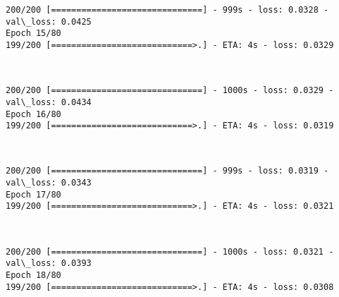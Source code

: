 \documentclass[11pt]{article}
\begin{document}
    \begin{Verbatim}[commandchars=\\\{\}]
200/200 [==============================] - 999s - loss: 0.0328 - val\_loss: 0.0425
Epoch 15/80
199/200 [============================>.] - ETA: 4s - loss: 0.0329
    \end{Verbatim}

    \begin{center}
    \end{center}
    { \hspace*{\fill} \\}
    
    \begin{Verbatim}[commandchars=\\\{\}]
200/200 [==============================] - 1000s - loss: 0.0329 - val\_loss: 0.0434
Epoch 16/80
199/200 [============================>.] - ETA: 4s - loss: 0.0319
    \end{Verbatim}

    \begin{center}
    \end{center}
    { \hspace*{\fill} \\}
    
    \begin{Verbatim}[commandchars=\\\{\}]
200/200 [==============================] - 999s - loss: 0.0319 - val\_loss: 0.0343
Epoch 17/80
199/200 [============================>.] - ETA: 4s - loss: 0.0321
    \end{Verbatim}

    \begin{center}
    \end{center}
    { \hspace*{\fill} \\}
    
    \begin{Verbatim}[commandchars=\\\{\}]
200/200 [==============================] - 1000s - loss: 0.0321 - val\_loss: 0.0393
Epoch 18/80
199/200 [============================>.] - ETA: 4s - loss: 0.0308
    \end{Verbatim}

    \begin{center}
    \end{center}
    { \hspace*{\fill} \\}
    
\end{document}
